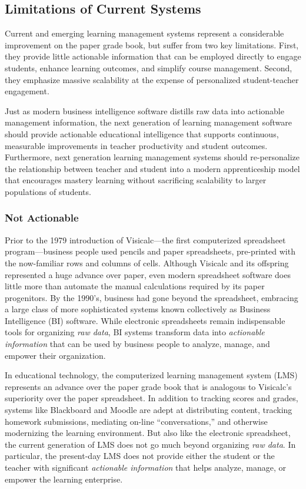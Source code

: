 \documentclass{article}
\begin{document}
\subsection{Limitations of Current Systems}
\label{sec:current-limitations}

Current and emerging learning management systems
represent a considerable improvement on the paper grade book,
but suffer from two key limitations.
First, they provide little actionable information
that can be employed directly
to engage students,
enhance learning outcomes,
and simplify course management.
Second, they emphasize massive scalability
at the expense of
personalized student-teacher engagement.

Just as modern business intelligence software
distills raw data into actionable management information,
the next generation of learning management software
should provide actionable educational intelligence
that supports continuous, measurable improvements
in teacher productivity and student outcomes.
Furthermore, next generation learning management systems
should re-personalize the relationship between teacher and student
into a modern apprenticeship model that
encourages mastery learning without sacrificing scalability
to larger populations of students.

\subsubsection{Not Actionable}

Prior to the 1979 introduction of
Visicalc---the first computerized spreadsheet program---business people
used pencils and paper spreadsheets,
pre-printed with the now-familiar rows and columns of cells.
Although Visicalc and its offspring represented a huge advance over paper,
even modern spreadsheet software does little more than automate the manual
calculations required by its paper progenitors.
By the 1990's,
business had gone beyond the spreadsheet,
embracing a large class of more sophisticated
systems known collectively as Business Intelligence (BI) software.
While electronic spreadsheets remain indispensable tools for organizing \emph{raw data},
BI systems transform data into \emph{actionable information}
that can be used by business people
to analyze, manage, and empower their organization.

In educational technology,
the computerized learning management system (LMS)
represents an advance over the paper grade book
that is analogous to Visicalc's superiority over the paper spreadsheet.
In addition to tracking scores and grades,
systems like Blackboard and Moodle
are adept at distributing content,
tracking homework submissions,
mediating on-line ``conversations,''
and otherwise modernizing the learning environment.
But also like the electronic spreadsheet,
the current generation of LMS does not go much beyond organizing \emph{raw data}.
In particular, the present-day LMS does not provide either the student or the teacher
with significant \emph{actionable information} that helps
analyze, manage, or empower the learning enterprise.
\end{document}

